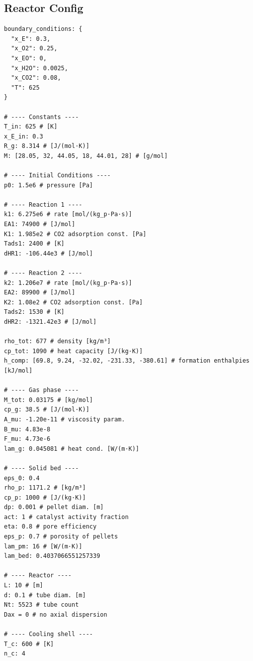 \subsection{Reactor Config}
\begin{lstlisting}[frame=single]
  boundary_conditions: {
  "x_E": 0.3,
  "x_O2": 0.25,
  "x_EO": 0,
  "x_H2O": 0.0025,
  "x_CO2": 0.08,
  "T": 625
}

# ---- Constants ----
T_in: 625 # [K]
x_E_in: 0.3
R_g: 8.314 # [J/(mol·K)]
M: [28.05, 32, 44.05, 18, 44.01, 28] # [g/mol]

# ---- Initial Conditions ----
p0: 1.5e6 # pressure [Pa]

# ---- Reaction 1 ----
k1: 6.275e6 # rate [mol/(kg_p·Pa·s)]
EA1: 74900 # [J/mol]
K1: 1.985e2 # CO2 adsorption const. [Pa]
Tads1: 2400 # [K]
dHR1: -106.44e3 # [J/mol]

# ---- Reaction 2 ----
k2: 1.206e7 # rate [mol/(kg_p·Pa·s)]
EA2: 89900 # [J/mol]
K2: 1.08e2 # CO2 adsorption const. [Pa]
Tads2: 1530 # [K]
dHR2: -1321.42e3 # [J/mol]

rho_tot: 677 # density [kg/m³]
cp_tot: 1090 # heat capacity [J/(kg·K)]
h_comp: [69.8, 9.24, -32.02, -231.33, -380.61] # formation enthalpies [kJ/mol]

# ---- Gas phase ----
M_tot: 0.03175 # [kg/mol]
cp_g: 38.5 # [J/(mol·K)]
A_mu: -1.20e-11 # viscosity param.
B_mu: 4.83e-8
F_mu: 4.73e-6
lam_g: 0.045081 # heat cond. [W/(m·K)]

# ---- Solid bed ----
eps_0: 0.4
rho_p: 1171.2 # [kg/m³]
cp_p: 1000 # [J/(kg·K)]
dp: 0.001 # pellet diam. [m]
act: 1 # catalyst activity fraction
eta: 0.8 # pore efficiency
eps_p: 0.7 # porosity of pellets
lam_pm: 16 # [W/(m·K)]
lam_bed: 0.4037066551257339

# ---- Reactor ----
L: 10 # [m]
d: 0.1 # tube diam. [m]
Nt: 5523 # tube count
Dax = 0 # no axial dispersion

# ---- Cooling shell ----
T_c: 600 # [K]
n_c: 4
\end{lstlisting}

